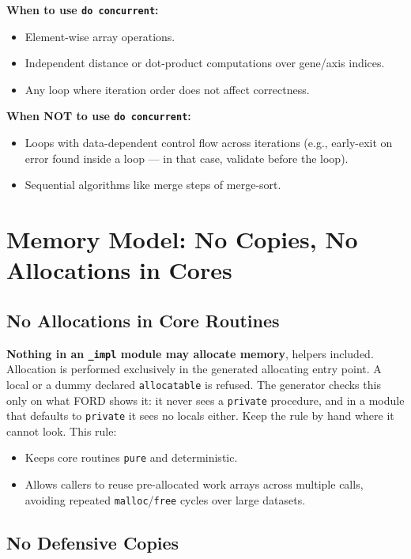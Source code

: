 \documentclass{article}
\begin{document}
\textbf{When to use \texttt{do concurrent}:}
\begin{itemize}
  \item Element-wise array operations.
  \item Independent distance or dot-product computations over gene/axis indices.
  \item Any loop where iteration order does not affect correctness.
\end{itemize}

\textbf{When NOT to use \texttt{do concurrent}:}
\begin{itemize}
  \item Loops with data-dependent control flow across iterations (e.g., early-exit on error found inside a loop — in that case, validate before the loop).
  \item Sequential algorithms like merge steps of merge-sort.
\end{itemize}

\section{Memory Model: No Copies, No Allocations in Cores}

\subsection{No Allocations in Core Routines}

\textbf{Nothing in an \texttt{\_impl} module may allocate memory}, helpers included. Allocation is performed exclusively in the generated allocating entry point. A local or a dummy declared \texttt{allocatable} is refused. The generator checks this only on what FORD shows it: it never sees a \texttt{private} procedure, and in a module that defaults to \texttt{private} it sees no locals either. Keep the rule by hand where it cannot look. This rule:
\begin{itemize}
  \item Keeps core routines \texttt{pure} and deterministic.
  \item Allows callers to reuse pre-allocated work arrays across multiple calls, avoiding repeated \texttt{malloc}/\texttt{free} cycles over large datasets.
\end{itemize}

\subsection{No Defensive Copies}
\end{document}
